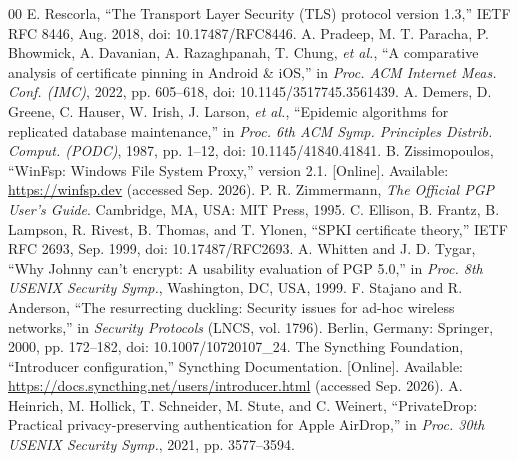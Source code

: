 \documentclass[conference,a4paper]{IEEEtran}
\begin{document}
\begin{thebibliography}{00}
 E. Rescorla, ``The Transport Layer Security (TLS) protocol version 1.3,'' IETF RFC 8446, Aug. 2018, doi: 10.17487/RFC8446.
 A. Pradeep, M. T. Paracha, P. Bhowmick, A. Davanian, A. Razaghpanah, T. Chung, \textit{et al.}, ``A comparative analysis of certificate pinning in Android \& iOS,'' in \textit{Proc. ACM Internet Meas. Conf. (IMC)}, 2022, pp. 605--618, doi: 10.1145/3517745.3561439.
 A. Demers, D. Greene, C. Hauser, W. Irish, J. Larson, \textit{et al.}, ``Epidemic algorithms for replicated database maintenance,'' in \textit{Proc. 6th ACM Symp. Principles Distrib. Comput. (PODC)}, 1987, pp. 1--12, doi: 10.1145/41840.41841.
 B. Zissimopoulos, ``WinFsp: Windows File System Proxy,'' version 2.1. [Online]. Available: \url{https://winfsp.dev} (accessed Sep. 2026).
 P. R. Zimmermann, \textit{The Official PGP User's Guide}. Cambridge, MA, USA: MIT Press, 1995.
 C. Ellison, B. Frantz, B. Lampson, R. Rivest, B. Thomas, and T. Ylonen, ``SPKI certificate theory,'' IETF RFC 2693, Sep. 1999, doi: 10.17487/RFC2693.
 A. Whitten and J. D. Tygar, ``Why Johnny can't encrypt: A usability evaluation of PGP 5.0,'' in \textit{Proc. 8th USENIX Security Symp.}, Washington, DC, USA, 1999.
 F. Stajano and R. Anderson, ``The resurrecting duckling: Security issues for ad-hoc wireless networks,'' in \textit{Security Protocols} (LNCS, vol. 1796). Berlin, Germany: Springer, 2000, pp. 172--182, doi: 10.1007/10720107\_24.
 The Syncthing Foundation, ``Introducer configuration,'' Syncthing Documentation. [Online]. Available: \url{https://docs.syncthing.net/users/introducer.html} (accessed Sep. 2026).
 A. Heinrich, M. Hollick, T. Schneider, M. Stute, and C. Weinert, ``PrivateDrop: Practical privacy-preserving authentication for Apple AirDrop,'' in \textit{Proc. 30th USENIX Security Symp.}, 2021, pp. 3577--3594.
\end{thebibliography}
\end{document}
